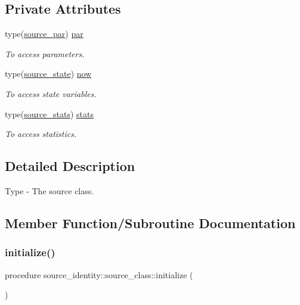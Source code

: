 \subsection*{Private Attributes}
\begin{DoxyCompactItemize}
\item 
type(\mbox{\hyperlink{structsource__identity_1_1source__par}{source\+\_\+par}}) \mbox{\hyperlink{structsource__identity_1_1source__class_a99403ddb327779cbdbb98f15ca9116a8}{par}}
\begin{DoxyCompactList}\small\item\em To access parameters. \end{DoxyCompactList}\item 
type(\mbox{\hyperlink{structsource__identity_1_1source__state}{source\+\_\+state}}) \mbox{\hyperlink{structsource__identity_1_1source__class_a75abb328a740fa4c23201e1c311312d1}{now}}
\begin{DoxyCompactList}\small\item\em To access state variables. \end{DoxyCompactList}\item 
type(\mbox{\hyperlink{structsource__identity_1_1source__stats}{source\+\_\+stats}}) \mbox{\hyperlink{structsource__identity_1_1source__class_a630571a5e588a6ced99787b473bf5e2f}{stats}}
\begin{DoxyCompactList}\small\item\em To access statistics. \end{DoxyCompactList}\end{DoxyCompactItemize}


\subsection{Detailed Description}
Type -\/ The source class. 

\subsection{Member Function/\+Subroutine Documentation}
\mbox{\label{structsource__identity_1_1source__class_af232e5b647bcb16f34dcc2f797ef7a95}} 
\subsubsection{\texorpdfstring{initialize()}{initialize()}}
{\footnotesize\ttfamily procedure source\+\_\+identity\+::source\+\_\+class\+::initialize (\begin{DoxyParamCaption}{ }\end{DoxyParamCaption})\hspace{0.3cm}{\ttfamily [private]}}

